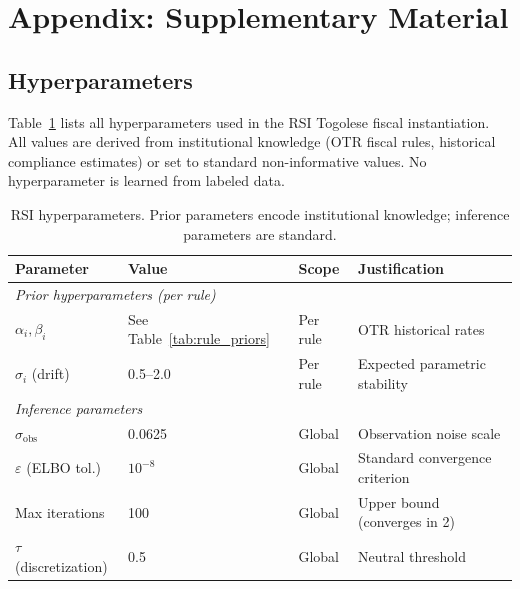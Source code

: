 \section{Appendix: Supplementary Material}
\label{sec:appendix}


\subsection{Hyperparameters}

Table~\ref{tab:hyperparams} lists all hyperparameters used in the RSI
Togolese fiscal instantiation. All values are derived from institutional
knowledge (OTR fiscal rules, historical compliance estimates) or set to
standard non-informative values. No hyperparameter is learned from
labeled data.

\begin{table}[H]
\centering
\caption{RSI hyperparameters. Prior parameters encode institutional
         knowledge; inference parameters are standard.}
\label{tab:hyperparams}
\renewcommand{\arraystretch}{1.15}
\begin{tabular}{llll}
\toprule
\textbf{Parameter} & \textbf{Value} & \textbf{Scope} & \textbf{Justification} \\
\midrule
\multicolumn{4}{l}{\textit{Prior hyperparameters (per rule)}} \\
$\alpha_i, \beta_i$ & See Table~\ref{tab:rule_priors} & Per rule & OTR historical rates \\
$\sigma_i$ (drift) & 0.5--2.0 & Per rule & Expected parametric stability \\
\midrule
\multicolumn{4}{l}{\textit{Inference parameters}} \\
$\sigma_{\mathrm{obs}}$ & 0.0625 & Global & Observation noise scale \\
$\varepsilon$ (ELBO tol.) & $10^{-8}$ & Global & Standard convergence criterion \\
Max iterations & 100 & Global & Upper bound (converges in 2) \\
$\tau$ (discretization) & 0.5 & Global & Neutral threshold \\
\bottomrule
\end{tabular}
\end{table}

